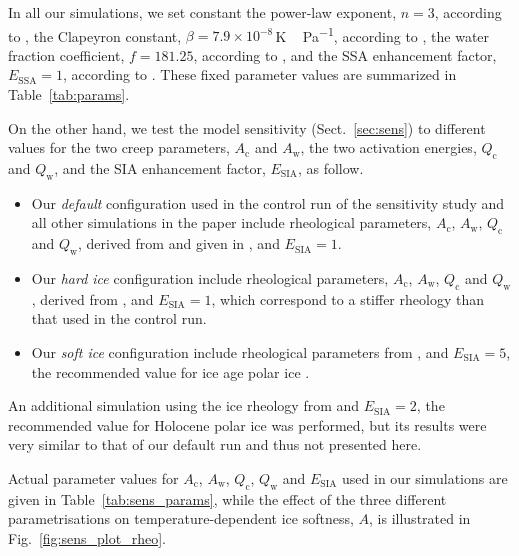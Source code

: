 \documentclass[tc, manuscript]{copernicus}
\begin{document}
      In all our simulations, we set constant the power-law exponent, $n=3$,
      according to \citet[p.~55--57]{Cuffey.Paterson.2010}, the Clapeyron
      constant, $\beta=7.9\times 10^{-8}$\,\unit{K\,Pa^{-1}}, according to
      \citet{Luthi.etal.2002}, the water fraction coefficient, $f=181.25$,
      according to \citet{Lliboutry.Duval.1985}, and the SSA enhancement
      factor, $E_{\text{SSA}}=1$, according to
      \citet[p.~77]{Cuffey.Paterson.2010}. These fixed parameter values are
      summarized in Table~\ref{tab:params}.

      On the other hand, we test the model sensitivity
      (Sect.~\ref{sec:sens}) to different values for the two creep
      parameters, $A_{\mathrm{c}}$ and $A_{\mathrm{w}}$, the two activation
      energies, $Q_{\mathrm{c}}$ and $Q_{\mathrm{w}}$, and the SIA
      enhancement factor, $E_{\text{SIA}}$, as follow.
%
\begin{itemize}
  \item Our \emph{default} configuration used in the control run of the
    sensitivity study and all other simulations in the paper include
    rheological parameters,
    $A_{\mathrm{c}}$, $A_{\mathrm{w}}$, $Q_{\mathrm{c}}$ and
    $Q_{\mathrm{w}}$, derived from \citet{Paterson.Budd.1982} and given in
    \citet[Eqn.~5]{Bueler.Brown.2009}, and $E_{\text{SIA}}=1$.
  \item Our \emph{hard ice} configuration include rheological parameters,
    $A_{\mathrm{c}}$, $A_{\mathrm{w}}$, $Q_{\mathrm{c}}$ and
    $Q_{\mathrm{w}}$, derived from \citet[p.~72 and
    76]{Cuffey.Paterson.2010}, and $E_{\text{SIA}}=1$, which correspond to a
    stiffer rheology than that used in the control run.
  \item Our \emph{soft ice} configuration include rheological parameters
    from \citet{Cuffey.Paterson.2010}, and $E_{\text{SIA}}=5$, the
    recommended value for ice age polar ice
    \citep[p.~77]{Cuffey.Paterson.2010}.
\end{itemize}
%
      An additional simulation using the ice rheology from
      \citet{Cuffey.Paterson.2010} and $E_{\text{SIA}}=2$, the recommended
      value for Holocene polar ice \citep[p.~77]{Cuffey.Paterson.2010} was
      performed, but its results were very similar to that of our default
      run and thus not presented here.

      Actual parameter values for $A_{\mathrm{c}}$, $A_{\mathrm{w}}$,
      $Q_{\mathrm{c}}$, $Q_{\mathrm{w}}$ and $E_{\text{SIA}}$ used in our
      simulations are given in Table~\ref{tab:sens_params}, while the effect
      of the three different parametrisations on temperature-dependent ice
      softness, $A$, is illustrated in Fig.~\ref{fig:sens_plot_rheo}.
\end{document}
